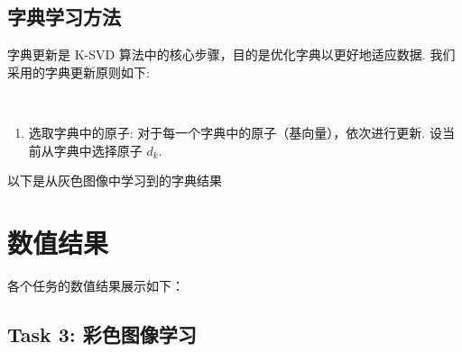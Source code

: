\documentclass[10.5pt]{myarticle}
\begin{document}
\subsection{字典学习方法}
字典更新是 K-SVD 算法中的核心步骤，目的是优化字典以更好地适应数据. 我们采用的字典更新原则如下: 

~

\begin{enumerate}
	\item 选取字典中的原子: 对于每一个字典中的原子（基向量），依次进行更新. 设当前从字典中选择原子 $d_k$. 
%	
%	
%	
\end{enumerate}

以下是从灰色图像中学习到的字典结果



\section{数值结果}

各个任务的数值结果展示如下：

\subsection{Task 3: 彩色图像学习}
\end{document}
